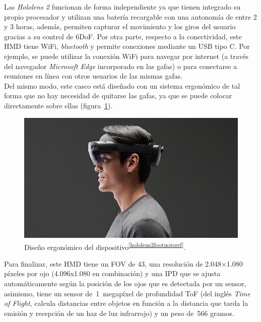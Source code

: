 
Las \textit{Hololens 2} funcionan de forma independiente ya que tienen integrado su propio procesador y utilizan una batería recargable con una autonomía de entre 2 y 3 horas, además, permiten capturar el movimiento y los giros del usuario gracias a su control de 6DoF. Por otra parte, respecto a la conectividad, este HMD tiene WiFi, \textit{bluetooth} y permite conexiones mediante un USB tipo C. Por ejemplo, se puede utilizar la conexión WiFi para navegar por internet (a través del navegador \textit{Microsoft Edge} incorporado en las gafas) o para conectarse a reuniones en línea con otros usuarios de las mismas gafas.\\

Del mismo modo, este casco  está diseñado con un sistema ergonómico de tal forma que no hay necesidad de quitarse las gafas, ya que se puede colocar directamente sobre ellas (figura~\ref{fig:hololensErgonomicas}).\\


\begin{figure}[H]
    \centering
    \includegraphics[scale=0.35]{Images/Estado del arte/hololens2_1.jpeg}
     \caption{Diseño ergonómico del dispositivo\textsuperscript{\ref{hololens2footnoteref}}.
  }
  \label{fig:hololensErgonomicas}
\end{figure}


Para finalizar, este HMD tiene un FOV de 43\degree , una resolución de 2.048×1.080 píxeles por ojo (4.096x1.080 en combinación) y una IPD que se ajusta automáticamente según la posición de los ojos que es detectada por un sensor, asimismo, tiene un sensor de~1~megapíxel de profundidad ToF (del inglés \textit{Time of Flight}, calcula distancias entre objetos en función a la distancia que tarda la emisión y recepción de un haz de luz infrarrojo) y un peso de~566 gramos.  





